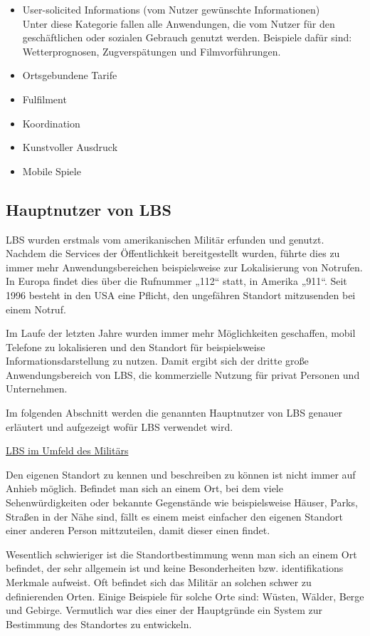 \begin{itemize}
	\item User-solicited Informations (vom Nutzer gewünschte Informationen)\\
Unter diese Kategorie fallen alle Anwendungen, die vom Nutzer für den geschäftlichen oder sozialen Gebrauch genutzt werden. Beispiele dafür sind: Wetterprognosen, Zugverspätungen und Filmvorführungen.
	\item Ortsgebundene Tarife
	\item Fulfilment
	\item Koordination
	\item Kunstvoller Ausdruck
	\item Mobile Spiele
\end{itemize}


\subsection{Hauptnutzer von LBS}

LBS wurden erstmals vom amerikanischen Militär erfunden und genutzt. Nachdem die Services der Öffentlichkeit bereitgestellt wurden, führte dies zu immer mehr Anwendungsbereichen beispielsweise zur Lokalisierung von Notrufen. In Europa findet dies über die Rufnummer „112“ statt, in Amerika „911“.  Seit 1996 besteht in den USA eine Pflicht, den ungefähren Standort mitzusenden bei einem Notruf. 

Im Laufe der letzten Jahre wurden immer mehr Möglichkeiten geschaffen, mobil Telefone zu lokalisieren und den Standort für beispielsweise Informationsdarstellung zu nutzen. Damit ergibt sich der dritte große Anwendungsbereich von LBS, die kommerzielle Nutzung für privat Personen und Unternehmen.

Im folgenden Abschnitt werden die genannten Hauptnutzer von LBS genauer erläutert und aufgezeigt wofür LBS verwendet wird.


\underline{LBS im Umfeld des Militärs}

Den eigenen Standort zu kennen und beschreiben zu können ist nicht immer auf Anhieb möglich. Befindet man sich an einem Ort, bei dem viele Sehenwürdigkeiten oder bekannte Gegenstände wie beispielsweise Häuser, Parks, Straßen in der Nähe sind, fällt es einem meist einfacher den eigenen Standort einer anderen Person mittzuteilen, damit dieser einen findet.

Wesentlich schwieriger ist die Standortbestimmung wenn man sich an einem Ort befindet, der sehr allgemein ist und keine Besonderheiten bzw. identifikations Merkmale aufweist. Oft befindet sich das Militär an solchen schwer zu definierenden Orten. Einige Beispiele für solche Orte sind: Wüsten, Wälder, Berge und Gebirge. Vermutlich war dies einer der Hauptgründe ein System zur Bestimmung des Standortes zu entwickeln. 

